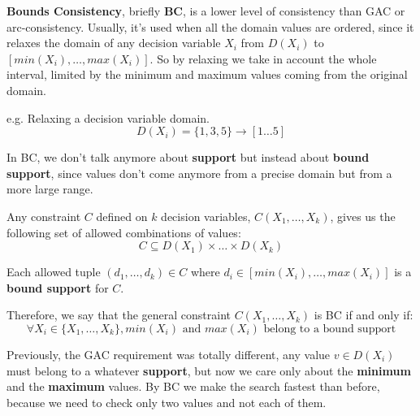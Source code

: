 \textbf{Bounds Consistency}, briefly \textbf{BC}, is a lower level of consistency than GAC or arc-consistency. Usually, it's used when all the domain values 
are ordered, since it relaxes the domain of any decision variable $X_i$ from $D(X_i)$ to $[min(X_i), \dots, max(X_i)]$. So by relaxing we take in account 
the whole interval, limited by the minimum and maximum values coming from the original domain.
\begin{example}
    e.g. Relaxing a decision variable domain. 
    $$ D(X_i) = \{1, 3, 5\} \rightarrow [1\dots5] $$ 
\end{example}
In BC, we don't talk anymore about \textbf{support} but instead about \textbf{bound support}, since values don't come anymore from a precise domain but 
from a more large range. 
\begin{example}[title = Formal example]
    Any constraint $C$ defined on $k$ decision variables, $C(X_1, \dots, X_k)$, gives us the following set of allowed combinations of values:
    $$ C \subseteq D(X_1) \times \dots \times D(X_k) $$

    Each allowed tuple $(d_1, \dots, d_k) \in C$ where $d_i \in [min(X_i), \dots, max(X_i)]$ is a \textbf{bound support} for $C$. \vspace{7pt}

    Therefore, we say that the general constraint $C(X_1, \dots, X_k)$ is BC if and only if:
    $$ \forall X_i \in \{X_1, \dots, X_k\}, min(X_i) \text{ and } max(X_i) \text{ belong to a bound support} $$
\end{example}
Previously, the GAC requirement was totally different, any value $v \in D(X_i)$ must belong to a whatever \textbf{support}, but now we care only about the
\textbf{minimum} and the \textbf{maximum} values. By BC we make the search fastest than before, because we need to check only two values and not each of them. \vspace{7pt}

